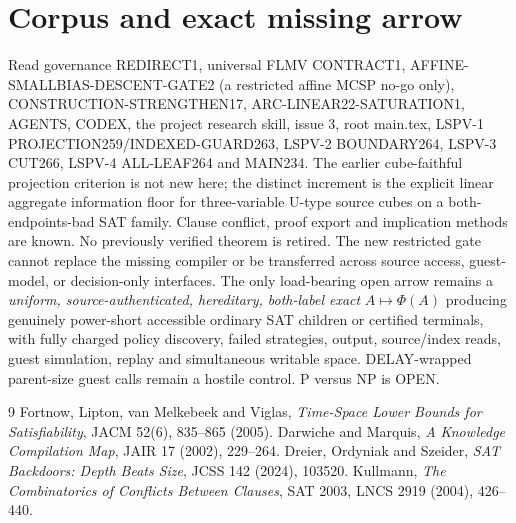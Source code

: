 \documentclass[11pt]{article}
\begin{document}
\section*{Corpus and exact missing arrow}
Read governance REDIRECT1, universal FLMV CONTRACT1,
AFFINE-SMALLBIAS-DESCENT-GATE2 (a restricted affine MCSP no-go only),
CONSTRUCTION-STRENGTHEN17, ARC-LINEAR22-SATURATION1, AGENTS,
CODEX, the project research skill, issue 3, root main.tex,
LSPV-1 PROJECTION259/INDEXED-GUARD263, LSPV-2 BOUNDARY264,
LSPV-3 CUT266, LSPV-4 ALL-LEAF264 and MAIN234.
The earlier cube-faithful projection criterion is not new here;
the distinct increment is the explicit linear aggregate information
floor for three-variable U-type source cubes on a both-endpoints-bad
SAT family. Clause conflict, proof export and implication methods are
known. No previously verified theorem is retired. The new restricted
gate cannot replace the missing compiler or be transferred across
source access, guest-model, or decision-only interfaces.
The only load-bearing open arrow remains a \emph{uniform,
source-authenticated, hereditary, both-label exact}
$A\mapsto\Phi(A)$ producing genuinely power-short accessible ordinary
SAT children or certified terminals, with fully charged
policy discovery, failed strategies, output, source/index reads,
guest simulation, replay and simultaneous writable space.
DELAY-wrapped parent-size guest calls remain a hostile control.
P versus NP is OPEN.
\begin{thebibliography}{9}
 Fortnow, Lipton, van Melkebeek and Viglas,
\emph{Time-Space Lower Bounds for Satisfiability},
JACM 52(6), 835--865 (2005).
 Darwiche and Marquis,
\emph{A Knowledge Compilation Map}, JAIR 17 (2002), 229--264.
 Dreier, Ordyniak and Szeider,
\emph{SAT Backdoors: Depth Beats Size}, JCSS 142 (2024), 103520.
 Kullmann, \emph{The Combinatorics of Conflicts Between Clauses},
SAT 2003, LNCS 2919 (2004), 426--440.
\end{thebibliography}
\end{document}
